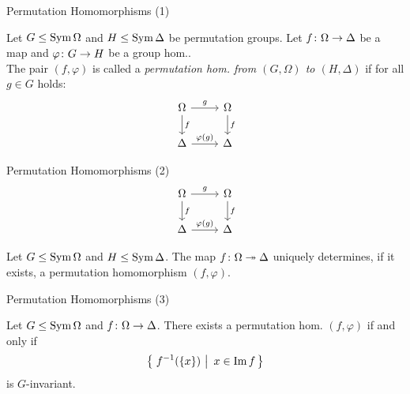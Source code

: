 \begin{frame}{Permutation Homomorphisms (1)}
    \begin{defn}
        Let $G \leq \operatorname{Sym} \Omega$ and $H \leq \operatorname{Sym} \Delta$ be permutation groups.
        \pause
        Let
        $f \colon \Omega \rightarrow \Delta$
        be a map
        and
        $\varphi \colon G \rightarrow H$
        be a group hom..
        \\
        \pause
        The pair $(f, \varphi)$ is called a
        \emph{%
        permutation hom. from $(G, \Omega)$ to $(H, \Delta)$
        }
        if for all $g \in G$ holds:
        \pause
        \[
        \begin{tikzcd}[ampersand replacement=\&]
            \Omega
                \ar[r, "g"]
                \ar[d, "f"]
            \&
            \Omega
                \ar[d, "f"]
            \\
            \Delta
                \ar[r, "\varphi(g)"]
            \&
            \Delta
        \end{tikzcd}
        \]
    \end{defn}
\end{frame}

\begin{frame}{Permutation Homomorphisms (2)}
    \[
    \begin{tikzcd}[ampersand replacement=\&]
        \Omega
            \ar[r, "g"]
            \ar[d, "f"]
        \&
        \Omega
            \ar[d, "f"]
        \\
        \Delta
            \ar[r, "\varphi(g)"]
        \&
        \Delta
    \end{tikzcd}
    \]

    \begin{rem}
        Let $G \leq \operatorname{Sym} \Omega$ and $H \leq \operatorname{Sym} \Delta$.
        The map $f \colon \Omega \twoheadrightarrow \Delta$ uniquely determines,
        if it exists,
        a permutation homomorphism
        $(f, \varphi)$.
    \end{rem}
\end{frame}

\begin{frame}{Permutation Homomorphisms (3)}
    \begin{lemma}
        Let $G \leq \operatorname{Sym} \Omega$ and $f \colon \Omega \rightarrow \Delta$.
        There exists a permutation hom.
        $(f, \varphi)$
        if and only if
        \pause
        \[
             \left\{ \left.\,  f ^ {-1}( \left\{ x \right\} )  ~\right|~  x \in \operatorname{Im} f  \,\right\} 
        \]
        is $G$-invariant.
    \end{lemma}
\end{frame}

